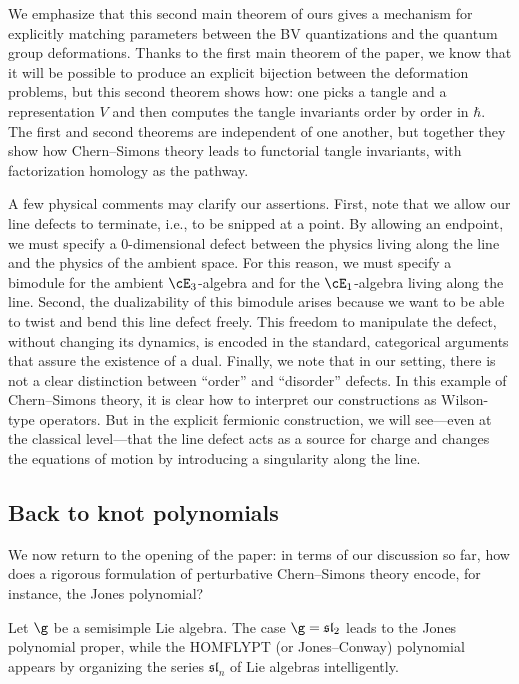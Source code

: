 \documentclass[10pt]{amsart}
\begin{document}
We emphasize that this second main theorem of ours gives a mechanism for explicitly matching parameters between the BV quantizations and the quantum group deformations.
Thanks to the first main theorem of the paper, we know that it will be possible to produce an explicit bijection between the deformation problems,
but this second theorem shows how:
one picks a tangle and a representation $V$ and then computes the tangle invariants order by order in $\hbar$.
The first and second theorems are independent of one another, 
but together they show how Chern--Simons theory leads to functorial tangle invariants,
with factorization homology as the pathway.

\begin{rmk}
A few physical comments may clarify our assertions.
First, note that we allow our line defects to terminate, i.e., to be snipped at a point.
By allowing an endpoint, we must specify a 0-dimensional defect between the physics living along the line and the physics of the ambient space.
For this reason, we must specify a bimodule for the ambient $\cE_3$-algebra and for the $\cE_1$-algebra living along the line.
Second, the dualizability of this bimodule arises because we want to be able to twist and bend this line defect freely.
This freedom to manipulate the defect, without changing its dynamics, is encoded in the standard, categorical arguments that assure the existence of a dual.
Finally, we note that in our setting, there is not a clear distinction between ``order'' and ``disorder'' defects.
In this example of Chern--Simons theory, it is clear how to interpret our constructions as Wilson-type operators.
But in the explicit fermionic construction, we will see---even at the classical level---that the line defect acts as a source for charge and changes the equations of motion by introducing a singularity along the line.
\end{rmk}

\subsection{Back to knot polynomials}

We now return to the opening of the paper:
in terms of our discussion so far,
how does a rigorous formulation of perturbative Chern--Simons theory encode, for instance, the Jones polynomial?

Let $\g$ be a semisimple Lie algebra.
The case $\g = \mathfrak{sl}_2$ leads to the Jones polynomial proper,
while the HOMFLYPT (or Jones--Conway) polynomial appears by organizing the series $\mathfrak{sl}_n$ of Lie algebras intelligently.
\end{document}
